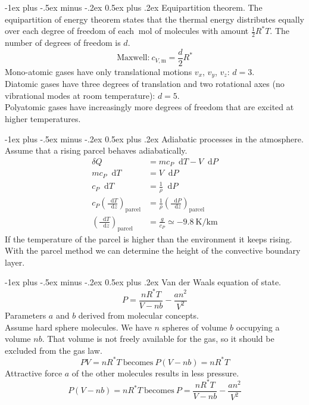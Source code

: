\documentclass[10pt,landscape,a4paper]{article}
\makeatletter
\renewcommand\d{\mathop{}\!\mathrm{d}}
\renewcommand{\section}{\@startsection{section}{1}{0mm}%
	{-1ex plus -.5ex minus -.2ex}%
	{0.5ex plus .2ex}%
	{\normalfont\large\bfseries}}
\makeatother
\begin{document}
\begin{multicols}{3}
	\section{Equipartition theorem.}
	The equipartition of energy theorem states that the thermal energy distributes equally over each degree of freedom of each $ \SI{}{\mole} $ of molecules with amount $ \frac{1}{2}R^\ast T $.
	The number of degrees of freedom is $ d $.
	\[
		\text{Maxwell:} \ c_{V,\text{m}}=\frac{d}{2}R^\ast
	\]
	Mono-atomic gases have only translational motions $ v_x $, $ v_y $, $ v_z $: $ d=3 $.\\
	Diatomic gases have three degrees of translation and two rotational axes (no vibrational modes at room temperature): $ d=5 $.\\
	Polyatomic gases have increasingly more degrees of freedom that are excited at higher temperatures.
	
	\section{Adiabatic processes in the atmosphere.}
	Assume that a rising parcel behaves adiabatically.
	\begin{align*}
		\delta Q                                        & =mc_P\d T-V\d P                                             \\
		mc_P\d T                                        & =V\d P                                                      \\
		c_P\d T                                         & =\frac{1}{\rho}\d P                                         \\
		c_P\left(\frac{\d T}{\d z}\right)_\text{parcel} & =\frac{1}{\rho}\left(\frac{\d P}{\d z}\right)_\text{parcel} \\
		\left(\frac{\d T}{\d z}\right)_\text{parcel}    & =\frac{g}{c_P}\simeq\SI{-9.8}{\kelvin\per\kilo\meter}
	\end{align*}
	If the temperature of the parcel is higher than the environment it keeps rising.
	With the parcel method we can determine the height of the convective boundary layer.
	
	\section{Van der Waals equation of state.}
	\[
		P=\frac{nR^\ast T}{V-nb}-\frac{an^2}{V^2}
	\]
	Parameters $ a $ and $ b $ derived from molecular concepts.\\
	Assume hard sphere molecules.
	We have $ n $ spheres of volume $ b $ occupying a volume $ nb $.
	That volume is not freely available for the gas, so it should be excluded from the gas law.
	\[
		PV=nR^\ast T \ \text{becomes} \ P(V-nb)=nR^\ast T
	\]
	Attractive force $ a $ of the other molecules results in less pressure.
	\[
		P(V-nb)=nR^\ast T \ \text{becomes} \ P=\frac{nR^\ast T}{V-nb}-\frac{an^2}{V^2}
	\]
	

\end{multicols}
\end{document}
